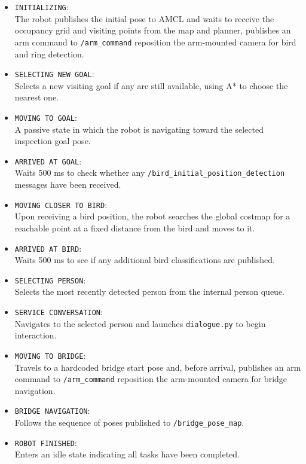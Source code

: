 \documentclass[a4paper]{article}
\begin{document}
\begin{itemize}
    \item \texttt{INITIALIZING}:\\
    The robot publishes the initial pose to AMCL and waits to receive the occupancy grid and visiting points from the map and planner, publishes an arm command to \texttt{/arm\_command} reposition the arm-mounted camera for bird and ring detection.

    \item \texttt{SELECTING NEW GOAL}:\\
    Selects a new visiting goal if any are still available, using A* to choose the nearest one.

    \item \texttt{MOVING TO GOAL}:\\
    A passive state in which the robot is navigating toward the selected inspection goal pose.

    \item \texttt{ARRIVED AT GOAL}:\\
    Waits 500 ms to check whether any \texttt{/bird\_initial\_position\_detection} messages have been received.

    \item \texttt{MOVING CLOSER TO BIRD}:\\
    Upon receiving a bird position, the robot searches the global costmap for a reachable point at a fixed distance from the bird and moves to it.

    \item \texttt{ARRIVED AT BIRD}:\\
    Waits 500 ms to see if any additional bird classifications are published.

    \item \texttt{SELECTING PERSON}:\\
    Selects the most recently detected person from the internal person queue.

    \item \texttt{SERVICE CONVERSATION}:\\
    Navigates to the selected person and launches \texttt{dialogue.py} to begin interaction.

    \item \texttt{MOVING TO BRIDGE}:\\
    Travels to a hardcoded bridge start pose and, before arrival, publishes an arm command to \texttt{/arm\_command} reposition the arm-mounted camera for bridge navigation.

    \item \texttt{BRIDGE NAVIGATION}:\\
    Follows the sequence of poses published to \texttt{/bridge\_pose\_map}.

    \item \texttt{ROBOT FINISHED}:\\
    Enters an idle state indicating all tasks have been completed.
\end{itemize}
\end{document}
